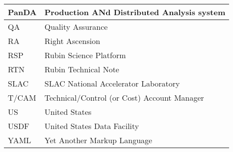 \begin{longtable}{p{}p{}}
PanDA &  Production ANd Distributed Analysis system \\\hline
QA & Quality Assurance \\\hline
RA & Right Ascension \\\hline
RSP & Rubin Science Platform \\\hline
RTN & Rubin Technical Note \\\hline
SLAC & SLAC National Accelerator Laboratory \\\hline
T/CAM & Technical/Control (or Cost) Account Manager \\\hline
US & United States \\\hline
USDF & United States Data Facility \\\hline
YAML & Yet Another Markup Language \\\hline
\end{longtable}
